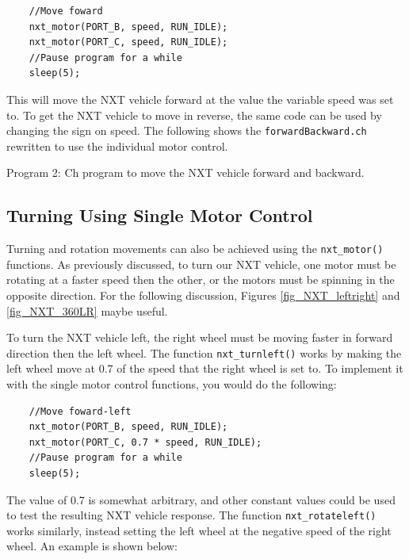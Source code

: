\documentclass[12pt]{article}
\begin{document}
\begin{verbatim}
    //Move foward
    nxt_motor(PORT_B, speed, RUN_IDLE);
    nxt_motor(PORT_C, speed, RUN_IDLE);
    //Pause program for a while
    sleep(5);
\end{verbatim}

This will move the NXT vehicle forward at the value the variable speed was set to. To get the 
NXT vehicle to move in reverse, the same code can be used by changing the sign on speed.
The following shows the \verb+forwardBackward.ch+ rewritten to use the individual motor control.



\begin{center}
Program 2: Ch program to move the NXT vehicle forward and backward.
\end{center}


\subsection{Turning Using Single Motor Control}

Turning and rotation movements can also be achieved using the \verb+nxt_motor()+ functions. As 
previously discussed, to turn our NXT vehicle, one motor must be rotating at a faster speed then 
the other, or the motors must be spinning in the opposite direction. For the following discussion, 
Figures \ref{fig_NXT_leftright} and \ref{fig_NXT_360LR} maybe useful.

To turn the NXT vehicle left, the right wheel must be moving faster in forward direction then the 
left wheel.  The function \verb+nxt_turnleft()+ works by making the left wheel move at 0.7 of the 
speed that the right wheel is set to. To implement it with the single motor control functions, you would  
do the following:

\begin{verbatim}
    //Move foward-left
    nxt_motor(PORT_B, speed, RUN_IDLE);
    nxt_motor(PORT_C, 0.7 * speed, RUN_IDLE);
    //Pause program for a while
    sleep(5);
\end{verbatim}

The value of 0.7 is somewhat arbitrary, and other constant values could be used to test the resulting 
NXT vehicle response. The function \verb+nxt_rotateleft()+ works similarly, instead setting the 
left wheel at the negative speed of the right wheel. An example is shown below:
\end{document}
